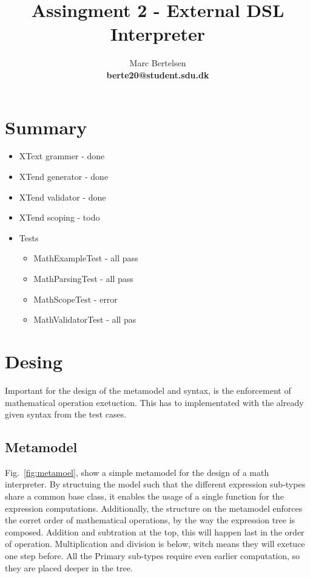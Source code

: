 \documentclass{article}
\begin{document}
\title{Assingment 2 - External DSL Interpreter}
\author{Marc Bertelsen\\
\textbf{berte20@student.sdu.dk}}

\maketitle

\pagebreak

\section{Summary}

\begin{itemize}
    \item XText grammer - done
    \item XTend generator - done
    \item XTend validator - done
    \item XTend scoping - todo
    \item Tests \begin{itemize}
        \item MathExampleTest - all pass
        \item MathParsingTest - all pass
        \item MathScopeTest - error
        \item MathValidatorTest - all pas
    \end{itemize}
\end{itemize}

\section{Desing}

Important for the design of the metamodel and syntax, is the enforcement of mathematical operation exetuction. This has to implementated with the already given syntax from the test cases.

\subsection{Metamodel}

Fig.~\ref{fig:metamoel}, show a simple metamodel for the design of a math interpreter. By structuing the model such that the different expression sub-types share a common base class, it enables the usage of a single function for the expression computations. Additionally, the structure on the metamodel enforces the corret order of mathematical operations, by the way the expression tree is composed. Addition and subtration at the top, this will happen last in the order of operation. Multiplication and division is below, witch means they will exetuce one step before. All the Primary sub-types require even earlier computation, so they are placed deeper in the tree.
\end{document}
